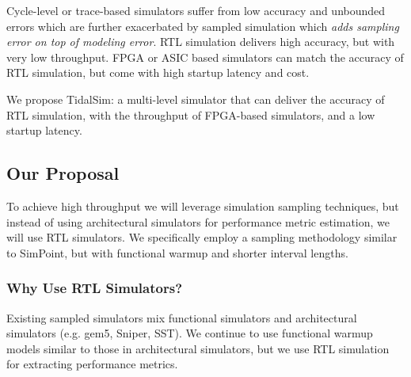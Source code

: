 \documentclass[sigplan,nonacm,10pt]{acmart}
\begin{document}

Cycle-level or trace-based simulators suffer from low accuracy and unbounded errors which are further exacerbated by sampled simulation which \textit{adds sampling error on top of modeling error}.
RTL simulation delivers high accuracy, but with very low throughput.
FPGA or ASIC based simulators can match the accuracy of RTL simulation, but come with high startup latency and cost.

We propose TidalSim: a multi-level simulator that can deliver the accuracy of RTL simulation, with the throughput of FPGA-based simulators, and a low startup latency.

\subsection{Our Proposal}

To achieve high throughput we will leverage simulation sampling techniques, but instead of using architectural simulators for performance metric estimation, we will use RTL simulators.
We specifically employ a sampling methodology similar to SimPoint, but with functional warmup and shorter interval lengths.

\subsubsection{Why Use RTL Simulators?}


Existing sampled simulators mix functional simulators and architectural simulators (e.g. gem5, Sniper, SST).
We continue to use functional warmup models similar to those in architectural simulators, but we use RTL simulation for extracting performance metrics.
\end{document}
